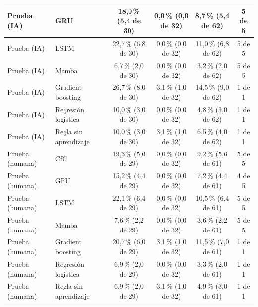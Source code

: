 \begin{tabular}{|l|l|c|c|c|c|}
Prueba (IA) & GRU & 18{,}0\,\% (5{,}4 de 30) & 0{,}0\,\% (0{,}0 de 32) & 8{,}7\,\% (5{,}4 de 62) & 5 de 5 \\ \hline
Prueba (IA) & LSTM & 22{,}7\,\% (6{,}8 de 30) & 0{,}0\,\% (0{,}0 de 32) & 11{,}0\,\% (6{,}8 de 62) & 5 de 5 \\ \hline
Prueba (IA) & Mamba & 6{,}7\,\% (2{,}0 de 30) & 0{,}0\,\% (0{,}0 de 32) & 3{,}2\,\% (2{,}0 de 62) & 5 de 5 \\ \hline
Prueba (IA) & Gradient boosting & 26{,}7\,\% (8{,}0 de 30) & 3{,}1\,\% (1{,}0 de 32) & 14{,}5\,\% (9{,}0 de 62) & 1 de 1 \\ \hline
Prueba (IA) & Regresión logística & 10{,}0\,\% (3{,}0 de 30) & 0{,}0\,\% (0{,}0 de 32) & 4{,}8\,\% (3{,}0 de 62) & 1 de 1 \\ \hline
Prueba (IA) & Regla sin aprendizaje & 10{,}0\,\% (3{,}0 de 30) & 3{,}1\,\% (1{,}0 de 32) & 6{,}5\,\% (4{,}0 de 62) & 1 de 1 \\ \hline
Prueba (humana) & CfC & 19{,}3\,\% (5{,}6 de 29) & 0{,}0\,\% (0{,}0 de 32) & 9{,}2\,\% (5{,}6 de 61) & 5 de 5 \\ \hline
Prueba (humana) & GRU & 15{,}2\,\% (4{,}4 de 29) & 0{,}0\,\% (0{,}0 de 32) & 7{,}2\,\% (4{,}4 de 61) & 4 de 5 \\ \hline
Prueba (humana) & LSTM & 22{,}1\,\% (6{,}4 de 29) & 0{,}0\,\% (0{,}0 de 32) & 10{,}5\,\% (6{,}4 de 61) & 5 de 5 \\ \hline
Prueba (humana) & Mamba & 7{,}6\,\% (2{,}2 de 29) & 0{,}0\,\% (0{,}0 de 32) & 3{,}6\,\% (2{,}2 de 61) & 5 de 5 \\ \hline
Prueba (humana) & Gradient boosting & 20{,}7\,\% (6{,}0 de 29) & 3{,}1\,\% (1{,}0 de 32) & 11{,}5\,\% (7{,}0 de 61) & 1 de 1 \\ \hline
Prueba (humana) & Regresión logística & 6{,}9\,\% (2{,}0 de 29) & 0{,}0\,\% (0{,}0 de 32) & 3{,}3\,\% (2{,}0 de 61) & 1 de 1 \\ \hline
Prueba (humana) & Regla sin aprendizaje & 6{,}9\,\% (2{,}0 de 29) & 3{,}1\,\% (1{,}0 de 32) & 4{,}9\,\% (3{,}0 de 61) & 1 de 1 \\ \hline
\end{tabular}

